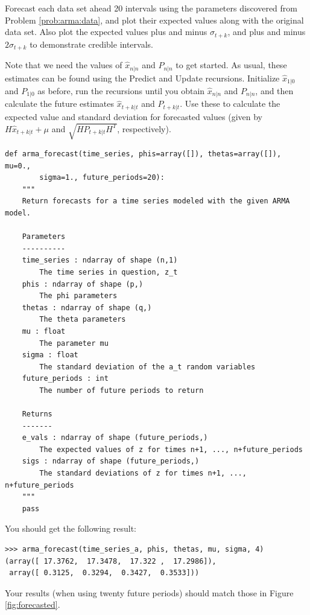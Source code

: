\begin{problem}
\label{prob:arma:forecast}
Forecast each data set ahead 20 intervals using the parameters discovered from
Problem \ref{prob:arma:data}, and plot their expected values along with the
original data set. Also plot the expected values plus and minus $\sigma_{t+k}$,
and plus and minus $2\sigma_{t+k}$ to demonstrate credible intervals.

Note that we need the values of $\hat{x}_{n|n}$ and $P_{n|n}$ to get started.
As usual, these estimates can be found using the Predict and Update recursions.
Initialize $\hat{x}_{1|0}$ and $P_{1|0}$ as before, run the recursions until you
obtain $\hat{x}_{n|n}$ and $P_{n|n}$, and then calculate the future
estimates $\hat{x}_{t+k|t}$ and $P_{t+k|t}$. Use these to calculate the expected
value and standard deviation for forecasted values (given by $H\hat{x}_{t+k|t} + \mu$
and $\sqrt{HP_{t+k|t}H^T}$, respectively).
\begin{lstlisting}
def arma_forecast(time_series, phis=array([]), thetas=array([]), mu=0.,
        sigma=1., future_periods=20):
    """
    Return forecasts for a time series modeled with the given ARMA model.

    Parameters
    ----------
    time_series : ndarray of shape (n,1)
        The time series in question, z_t
    phis : ndarray of shape (p,)
        The phi parameters
    thetas : ndarray of shape (q,)
        The theta parameters
    mu : float
        The parameter mu
    sigma : float
        The standard deviation of the a_t random variables
    future_periods : int
        The number of future periods to return

    Returns
    -------
    e_vals : ndarray of shape (future_periods,)
        The expected values of z for times n+1, ..., n+future_periods
    sigs : ndarray of shape (future_periods,)
        The standard deviations of z for times n+1, ..., n+future_periods
    """
    pass
\end{lstlisting}

\vspace{3mm} \noindent
You should get the following result:
\begin{lstlisting}
>>> arma_forecast(time_series_a, phis, thetas, mu, sigma, 4)
(array([ 17.3762,  17.3478,  17.322 ,  17.2986]),
 array([ 0.3125,  0.3294,  0.3427,  0.3533]))
\end{lstlisting}

\vspace{3mm} \noindent
Your results (when using twenty future periods) should match those in Figure \ref{fig:forecasted}.
\end{problem}

